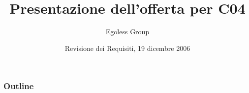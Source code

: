 



\title{Presentazione dell'offerta per C04}

\author{Egoless Group}

\date[RR 19/12/2006] %
{Revisione dei Requisiti, 19 dicembre 2006}

\subject{Presentazione dell'offerta per il capitolato C04}






\begin{frame}
  \titlepage
\end{frame}

\begin{frame}
  \frametitle{Outline}
  \tableofcontents
\end{frame}





